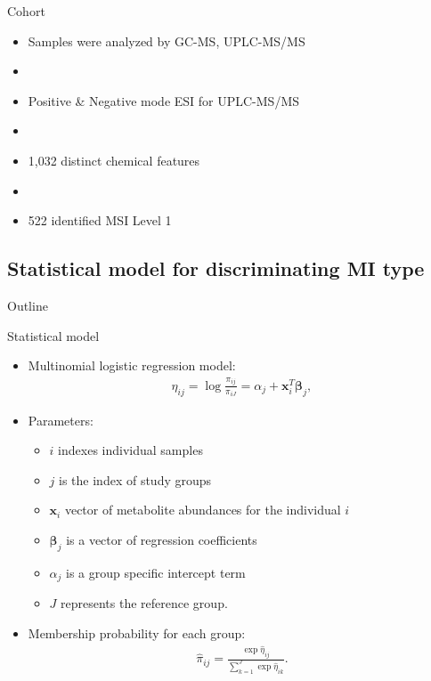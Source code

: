 \documentclass[xcolor=dvipsnames]{beamer}
\begin{document}
\begin{frame}{Cohort}
\vspace{-10pt}
\begin{itemize}
\item Samples were analyzed by GC-MS, UPLC-MS/MS \pause
\item[]
\item Positive \& Negative mode ESI for UPLC-MS/MS \pause
\item[]
\item 1,032 distinct chemical features \pause
\item[]
\item 522 identified MSI Level 1
\end{itemize}
\end{frame}

\subsection{Statistical model for discriminating MI type}
\begin{frame}{Outline}
\vspace{-10.5pt}
\tableofcontents[currentsection,subsectionstyle=show/shaded/hide]
\end{frame}

\begin{frame}{Statistical model}
\vspace{-10.5pt}
\begin{itemize}
\item Multinomial logistic regression model:
\begin{align*}
\eta_{ij} = \log \frac{\pi_{ij}}{\pi_{iJ}} = \alpha_j + \textbf{x}_i^T \boldsymbol{\beta}_j,
\end{align*} \pause
\item Parameters:
\begin{itemize}
\item $i$ indexes individual samples
\item $j$ is the index of study groups
\item $\textbf{x}_i$ vector of metabolite abundances for the individual $i$
\item $\boldsymbol{\beta}_j$ is a vector of regression coefficients 
\item $\alpha_j$ is a group specific intercept term
\item $J$ represents the reference group.
\end{itemize} \pause
\item Membership probability for each group:
\begin{align*}
\hat{\pi}_{ij} = \frac{\exp \hat{\eta}_{ij}}{\sum_{k=1}^{J}\exp \hat{\eta}_{ik}}.
\end{align*}
\end{itemize}
\end{frame}
\end{document}
